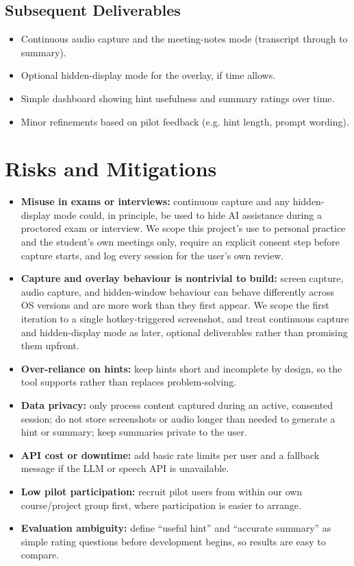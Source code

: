 \documentclass[11pt]{article}
\begin{document}
\subsection{Subsequent Deliverables}
\begin{itemize}
  \item Continuous audio capture and the meeting-notes mode (transcript through to summary).
  \item Optional hidden-display mode for the overlay, if time allows.
  \item Simple dashboard showing hint usefulness and summary ratings over time.
  \item Minor refinements based on pilot feedback (e.g. hint length, prompt wording).
\end{itemize}

\section{Risks and Mitigations}
\begin{itemize}
  \item \textbf{Misuse in exams or interviews:} continuous capture and any hidden-display
    mode could, in principle, be used to hide AI assistance during a proctored exam or
    interview. We scope this project's use to personal practice and the student's own
    meetings only, require an explicit consent step before capture starts, and log every
    session for the user's own review.
  \item \textbf{Capture and overlay behaviour is nontrivial to build:} screen capture, audio
    capture, and hidden-window behaviour can behave differently across OS versions and are
    more work than they first appear. We scope the first iteration to a single
    hotkey-triggered screenshot, and treat continuous capture and hidden-display mode as
    later, optional deliverables rather than promising them upfront.
  \item \textbf{Over-reliance on hints:} keep hints short and incomplete by design, so the
    tool supports rather than replaces problem-solving.
  \item \textbf{Data privacy:} only process content captured during an active, consented
    session; do not store screenshots or audio longer than needed to generate a hint or
    summary; keep summaries private to the user.
  \item \textbf{API cost or downtime:} add basic rate limits per user and a fallback message
    if the LLM or speech API is unavailable.
  \item \textbf{Low pilot participation:} recruit pilot users from within our own
    course/project group first, where participation is easier to arrange.
  \item \textbf{Evaluation ambiguity:} define ``useful hint'' and ``accurate summary'' as
    simple rating questions before development begins, so results are easy to compare.
\end{itemize}
\end{document}
